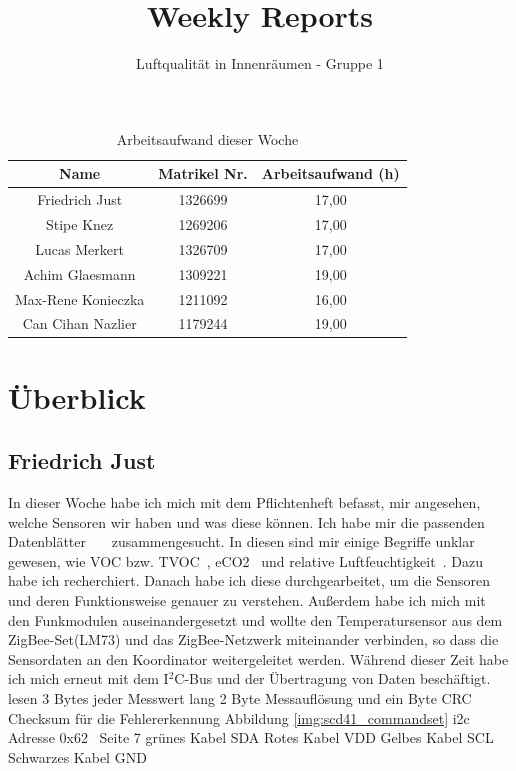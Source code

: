 \documentclass[]{article}
\title{Weekly Reports}
\author{Luftqualität in Innenräumen - Gruppe 1}
\begin{document}
\maketitle

\begin{table}[h!]
	\centering
	\begin{tabular}{|c|c|c|}
		\hline
		{\textbf{Name}}				&		{\textbf{Matrikel Nr.}} & {\textbf{Arbeitsaufwand (h)}} \\
		\hline
		Friedrich Just				&		1326699 				&	17,00	\\
		\hline
		Stipe Knez				&		1269206 				&	17,00	\\
		\hline
		Lucas Merkert				&		1326709					&	17,00	\\
		\hline
		Achim Glaesmann				&		1309221					&	19,00	\\
		\hline
		Max-Rene Konieczka			&		1211092					&	16,00	\\
		\hline
		Can Cihan Nazlier			&		1179244					&	19,00	\\
		\hline
	\end{tabular}
	\caption{Arbeitsaufwand dieser Woche}
	\label{tab:worakload}
\end{table}



\section{Überblick}


\subsection{Friedrich Just}
In dieser Woche habe ich mich mit dem Pflichtenheft befasst, mir angesehen, welche Sensoren wir haben und was diese können. Ich habe mir die passenden Datenblätter~\cite{datasheetcss811}~\cite{datasheetscd41}~\cite{datasheetsht21} zusammengesucht. In diesen sind mir einige Begriffe unklar gewesen, wie VOC bzw. TVOC~\cite{tvoc}, eCO2~\cite{eco2} und relative Luftfeuchtigkeit~\cite{realtiveluftfeuchtigkeit}. Dazu habe ich recherchiert. Danach habe ich diese durchgearbeitet, um die Sensoren und deren Funktionsweise genauer zu verstehen. Außerdem habe ich mich mit den Funkmodulen auseinandergesetzt und wollte den Temperatursensor aus dem ZigBee-Set(LM73) und das ZigBee-Netzwerk miteinander verbinden, so dass die Sensordaten an den Koordinator weitergeleitet werden. Während dieser Zeit habe ich mich erneut mit dem I$^2$C-Bus und der Übertragung von Daten beschäftigt.
lesen 3 Bytes jeder Messwert lang 2 Byte Messauflösung und ein Byte CRC Checksum für die Fehlererkennung {Abbildung \ref{img:scd41_commandset}}
i2c Adresse 0x62 ~\cite{datasheetscd41}Seite 7
grünes Kabel SDA 
Rotes Kabel VDD
Gelbes Kabel SCL
Schwarzes Kabel GND~\cite{sht21cabelconf}
\end{document}
